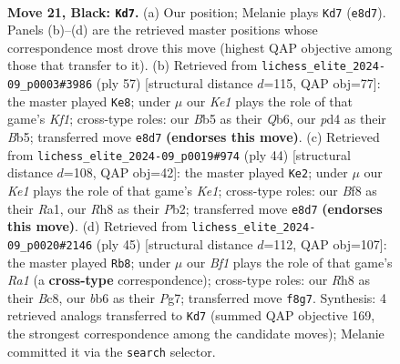 \documentclass[11pt]{article}
\begin{document}
\begin{figure}[p]
\label{fig:thought-m39}
\end{figure}

\clearpage

\begin{figure}[p]\centering
\begin{subfigure}{0.46\textwidth}\centering
\resizebox{\linewidth}{!}{%
\newchessgame
\chessboard[
  setfen={4kb1r/1p2pp1n/1B1p2p1/1b6/3PP2p/rP2RP2/P4QPP/2K3R1 b k - 1 21},
  showmover=false,
  pgfstyle=straightmove, color=movearrow, markmove={e8-d7}
]}
\caption{}
\end{subfigure}\hfill
\begin{subfigure}{0.46\textwidth}\centering
\resizebox{\linewidth}{!}{%
\newchessgame
\chessboard[
  setfen={5k2/4p2p/pq1p3P/1b1P2Q1/4P3/n4P2/P1P1r1PR/2R4K b - - 0 29},
  showmover=false,
  pgfstyle=straightmove, color=movearrow, markmove={f8-e8}
]}
\caption{}
\end{subfigure}
\\[4pt]
\begin{subfigure}{0.46\textwidth}\centering
\resizebox{\linewidth}{!}{%
\newchessgame
\chessboard[
  setfen={r1b3R1/pp1k1p2/4pq1P/2p5/P2pP3/N2P4/1PPB3p/R3K3 w Q - 2 23},
  showmover=false,
  pgfstyle=straightmove, color=movearrow, markmove={e1-e2}
]}
\caption{}
\end{subfigure}\hfill
\begin{subfigure}{0.46\textwidth}\centering
\resizebox{\linewidth}{!}{%
\newchessgame
\chessboard[
  setfen={r1b3k1/3p2pp/2p1pr2/p7/2P2P2/qP1B4/P2Q2PP/K2R3R b - - 1 23},
  showmover=false,
  pgfstyle=straightmove, color=movearrow, markmove={a8-b8}
]}
\caption{}
\end{subfigure}
\caption{\textbf{Move 21, Black: \texttt{Kd7}.} (a) Our position; Melanie plays \texttt{Kd7} (\texttt{e8d7}). Panels (b)--(d) are the retrieved master positions whose correspondence most drove this move (highest QAP objective among those that transfer to it). (b) Retrieved from \texttt{lichess\_elite\_2024-09\_p0003\#3986} (ply 57) [structural distance $d$=115, QAP obj=77]: the master played \texttt{Ke8}; under $\mu$ our \emph{Ke1} plays the role of that game's \emph{Kf1}; cross-type roles: our \emph{B}b5 as their \emph{Q}b6, our \emph{p}d4 as their \emph{B}b5; transferred move \texttt{e8d7} \textbf{(endorses this move)}. (c) Retrieved from \texttt{lichess\_elite\_2024-09\_p0019\#974} (ply 44) [structural distance $d$=108, QAP obj=42]: the master played \texttt{Ke2}; under $\mu$ our \emph{Ke1} plays the role of that game's \emph{Ke1}; cross-type roles: our \emph{B}f8 as their \emph{R}a1, our \emph{R}h8 as their \emph{P}b2; transferred move \texttt{e8d7} \textbf{(endorses this move)}. (d) Retrieved from \texttt{lichess\_elite\_2024-09\_p0020\#2146} (ply 45) [structural distance $d$=112, QAP obj=107]: the master played \texttt{Rb8}; under $\mu$ our \emph{Bf1} plays the role of that game's \emph{Ra1} (a \textbf{cross-type} correspondence); cross-type roles: our \emph{R}h8 as their \emph{B}c8, our \emph{b}b6 as their \emph{P}g7; transferred move \texttt{f8g7}. Synthesis: 4 retrieved analogs transferred to \texttt{Kd7} (summed QAP objective 169, the strongest correspondence among the candidate moves); Melanie committed it via the \texttt{search} selector.}

\end{figure}
\end{document}
